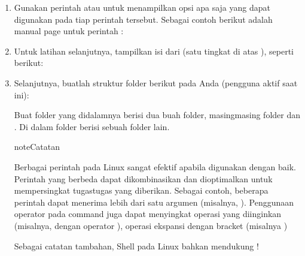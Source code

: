 \documentclass[letterpaper,10pt,english]{sphinxmanual}
\begin{document}
\begin{enumerate}
\begin{savenotes}
\begin{tabulary}{\linewidth}[t]{|T|T|}
&

\\
\hline
\end{tabulary}
\par
\sphinxattableend\end{savenotes}

 

\item {} 
Gunakan perintah  atau  untuk menampilkan opsi apa saja yang dapat digunakan pada tiap perintah tersebut. Sebagai contoh berikut adalah manual page untuk perintah :
 

\item {} 
Untuk latihan selanjutnya, tampilkan isi dari  (satu tingkat di atas ), seperti berikut:
 

\item {} 
Selanjutnya, buatlah struktur folder berikut pada  Anda (pengguna aktif saat ini):

Buat folder  yang didalamnya berisi dua buah folder, masing\sphinxhyphen{}masing folder  dan . Di dalam folder  berisi sebuah folder lain.

\begin{sphinxadmonition}{note}{Catatan}

Berbagai perintah pada  Linux sangat efektif apabila digunakan dengan baik. Perintah yang berbeda dapat dikombinasikan dan dioptimalkan untuk mempersingkat tugas\sphinxhyphen{}tugas yang diberikan. Sebagai contoh, beberapa perintah dapat menerima lebih dari satu argumen (misalnya, ). Penggunaan operator pada command juga dapat menyingkat operasi yang diinginkan (misalnya,  dengan operator ), operasi ekspansi dengan bracket (misalnya )

Sebagai catatan tambahan, Shell pada Linux bahkan mendukung !
\end{sphinxadmonition}


\end{enumerate}
\end{document}
